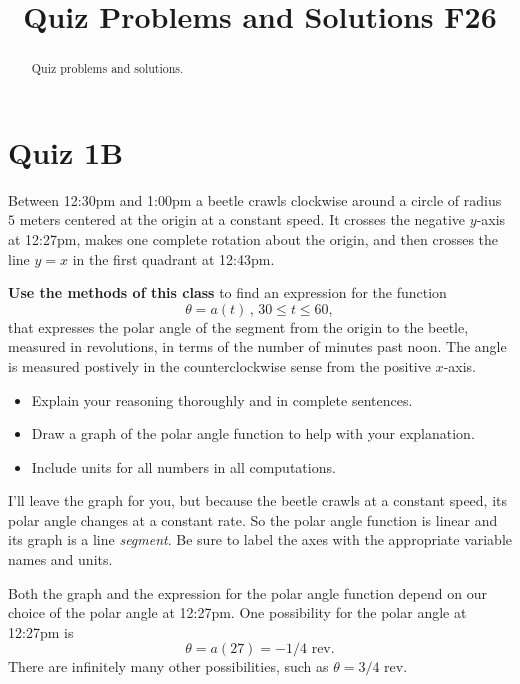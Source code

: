\documentclass{ximera}
\title{Quiz Problems and Solutions F26}
\begin{document}
\begin{abstract}
Quiz problems and solutions.
\end{abstract}
\maketitle

\section{Quiz 1B}

\begin{question}
Between 12:30pm and 1:00pm a beetle crawls clockwise around a circle of radius $5$ meters centered at the origin at a constant speed. It crosses the negative $y$-axis at 12:27pm, makes one complete rotation about the origin, and then crosses the line $y=x$ in the first quadrant at 12:43pm. 

{\bf Use the methods of this class} to find an expression for the function 
\[
   \theta = a(t) \, , \, 30\leq t \leq 60,
\]
that expresses the polar angle of the segment from the origin to the beetle, measured in revolutions, in terms of the number of  minutes past noon. The angle is measured postively in the counterclockwise sense from the positive $x$-axis.


\begin{itemize}
\item Explain your reasoning thoroughly and in complete sentences.

\item Draw a graph of the polar angle function to help with your explanation.

\item Include units for all numbers in all computations.

\end{itemize}

\begin{explanation}
I'll leave the graph for you, but because the beetle crawls at a constant speed, its polar angle changes at a constant rate. So the polar angle function is linear and its graph is a line \emph{segment}.  Be sure to label the axes with the appropriate variable names and units.

Both the graph and the expression for the polar angle function depend on our choice of the polar angle at 12:27pm. One possibility for the polar angle at 12:27pm is
\[
  \theta = a(27) = -1/4 \text{ rev}.
\] 
There are infinitely many other possibilities, such as $\theta=3/4$ rev. 


\end{explanation}
\end{question}
\end{document}
